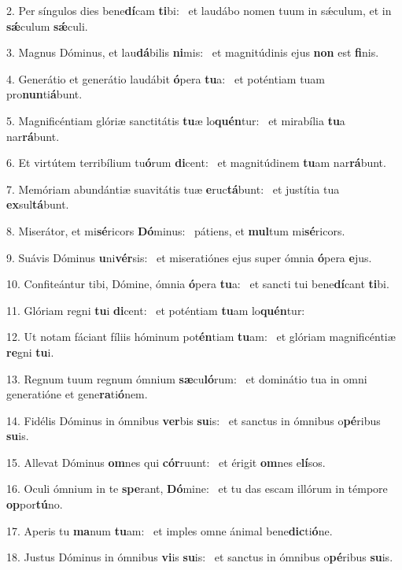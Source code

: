 2. Per síngulos dies bene\textbf{dí}cam \textbf{ti}bi: \ast\  et laudábo nomen tuum in sǽculum, et in \textbf{sǽ}culum \textbf{sǽ}culi.\

3. Magnus Dóminus, et lau\textbf{dá}bilis \textbf{ni}mis: \ast\  et magnitúdinis ejus \textbf{non} est \textbf{fi}nis.\

4. Generátio et generátio laudábit \textbf{ó}pera \textbf{tu}a: \ast\  et poténtiam tuam pro\textbf{nun}ti\textbf{á}bunt.\

5. Magnificéntiam glóriæ sanctitátis \textbf{tu}æ lo\textbf{quén}tur: \ast\  et mirabília \textbf{tu}a nar\textbf{rá}bunt.\

6. Et virtútem terribílium tu\textbf{ó}rum \textbf{di}cent: \ast\  et magnitúdinem \textbf{tu}am nar\textbf{rá}bunt.\

7. Memóriam abundántiæ suavitátis tuæ \textbf{e}ruc\textbf{tá}bunt: \ast\  et justítia tua \textbf{ex}sul\textbf{tá}bunt.\

8. Miserátor, et mi\textbf{sé}ricors \textbf{Dó}minus: \ast\  pátiens, et \textbf{mul}tum mi\textbf{sé}ricors.\

9. Suávis Dóminus \textbf{u}ni\textbf{vér}sis: \ast\  et miseratiónes ejus super ómnia \textbf{ó}pera \textbf{e}jus.\

10. Confiteántur tibi, Dómine, ómnia \textbf{ó}pera \textbf{tu}a: \ast\  et sancti tui bene\textbf{dí}cant \textbf{ti}bi.\

11. Glóriam regni \textbf{tu}i \textbf{di}cent: \ast\  et poténtiam \textbf{tu}am lo\textbf{quén}tur:\

12. Ut notam fáciant fíliis hóminum pot\textbf{én}tiam \textbf{tu}am: \ast\  et glóriam magnificéntiæ \textbf{re}gni \textbf{tu}i.\

13. Regnum tuum regnum ómnium \textbf{sæ}cu\textbf{ló}rum: \ast\  et dominátio tua in omni generatióne et gene\textbf{ra}ti\textbf{ó}nem.\

14. Fidélis Dóminus in ómnibus \textbf{ver}bis \textbf{su}is: \ast\  et sanctus in ómnibus o\textbf{pé}ribus \textbf{su}is.\

15. Allevat Dóminus \textbf{om}nes qui \textbf{cór}ruunt: \ast\  et érigit \textbf{om}nes e\textbf{lí}sos.\

16. Oculi ómnium in te \textbf{spe}rant, \textbf{Dó}mine: \ast\  et tu das escam illórum in témpore \textbf{op}por\textbf{tú}no.\

17. Aperis tu \textbf{ma}num \textbf{tu}am: \ast\  et imples omne ánimal bene\textbf{dic}ti\textbf{ó}ne.\

18. Justus Dóminus in ómnibus \textbf{vi}is \textbf{su}is: \ast\  et sanctus in ómnibus o\textbf{pé}ribus \textbf{su}is.\

